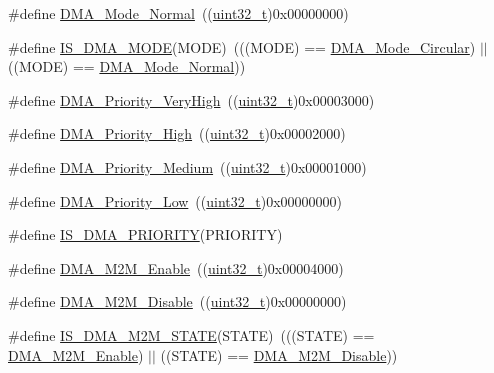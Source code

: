 \begin{DoxyCompactItemize}
\item 
\#define \hyperlink{group___d_m_a__circular__normal__mode_ga36400f5b5095f1102ede4760d7a5959c}{D\+M\+A\+\_\+\+Mode\+\_\+\+Normal}~((\hyperlink{_p_e___types_8h_a33594304e786b158f3fb30289278f5af}{uint32\+\_\+t})0x00000000)
\item 
\#define \hyperlink{group___d_m_a__circular__normal__mode_gad88ee5030574d6a573904378fb62c7ac}{I\+S\+\_\+\+D\+M\+A\+\_\+\+M\+O\+DE}(M\+O\+DE)~(((M\+O\+DE) == \hyperlink{openmotestm_2library_2inc_2stm32f10x__dma_8h_a36327b14c302098fbc5823ac3f1ae020}{D\+M\+A\+\_\+\+Mode\+\_\+\+Circular}) $\vert$$\vert$ ((M\+O\+DE) == \hyperlink{openmotestm_2library_2inc_2stm32f10x__dma_8h_a36400f5b5095f1102ede4760d7a5959c}{D\+M\+A\+\_\+\+Mode\+\_\+\+Normal}))
\item 
\#define \hyperlink{group___d_m_a__priority__level_gadccd2f8b2ac24ba4fd485dd5b9b48671}{D\+M\+A\+\_\+\+Priority\+\_\+\+Very\+High}~((\hyperlink{_p_e___types_8h_a33594304e786b158f3fb30289278f5af}{uint32\+\_\+t})0x00003000)
\item 
\#define \hyperlink{group___d_m_a__priority__level_gae2441c0b4d4ba9945a6f4f7d08045a8e}{D\+M\+A\+\_\+\+Priority\+\_\+\+High}~((\hyperlink{_p_e___types_8h_a33594304e786b158f3fb30289278f5af}{uint32\+\_\+t})0x00002000)
\item 
\#define \hyperlink{group___d_m_a__priority__level_ga8e0d4a958f4288c6c759945789490f38}{D\+M\+A\+\_\+\+Priority\+\_\+\+Medium}~((\hyperlink{_p_e___types_8h_a33594304e786b158f3fb30289278f5af}{uint32\+\_\+t})0x00001000)
\item 
\#define \hyperlink{group___d_m_a__priority__level_gaf414e0aa8dd42aee6f83f88ab6175179}{D\+M\+A\+\_\+\+Priority\+\_\+\+Low}~((\hyperlink{_p_e___types_8h_a33594304e786b158f3fb30289278f5af}{uint32\+\_\+t})0x00000000)
\item 
\#define \hyperlink{group___d_m_a__priority__level_gaa1cae2ab458948511596467c87cd02b6}{I\+S\+\_\+\+D\+M\+A\+\_\+\+P\+R\+I\+O\+R\+I\+TY}(P\+R\+I\+O\+R\+I\+TY)
\item 
\#define \hyperlink{group___d_m_a__memory__to__memory_ga046a1de15235c254c0511c08cae3065a}{D\+M\+A\+\_\+\+M2\+M\+\_\+\+Enable}~((\hyperlink{_p_e___types_8h_a33594304e786b158f3fb30289278f5af}{uint32\+\_\+t})0x00004000)
\item 
\#define \hyperlink{group___d_m_a__memory__to__memory_ga86e0a7076f0badd509fac6576f3b5355}{D\+M\+A\+\_\+\+M2\+M\+\_\+\+Disable}~((\hyperlink{_p_e___types_8h_a33594304e786b158f3fb30289278f5af}{uint32\+\_\+t})0x00000000)
\item 
\#define \hyperlink{group___d_m_a__memory__to__memory_gae0241d6265efc45f87b113cf44e50c06}{I\+S\+\_\+\+D\+M\+A\+\_\+\+M2\+M\+\_\+\+S\+T\+A\+TE}(S\+T\+A\+TE)~(((S\+T\+A\+TE) == \hyperlink{openmotestm_2library_2inc_2stm32f10x__dma_8h_a046a1de15235c254c0511c08cae3065a}{D\+M\+A\+\_\+\+M2\+M\+\_\+\+Enable}) $\vert$$\vert$ ((S\+T\+A\+TE) == \hyperlink{openmotestm_2library_2inc_2stm32f10x__dma_8h_a86e0a7076f0badd509fac6576f3b5355}{D\+M\+A\+\_\+\+M2\+M\+\_\+\+Disable}))

\end{DoxyCompactItemize}
